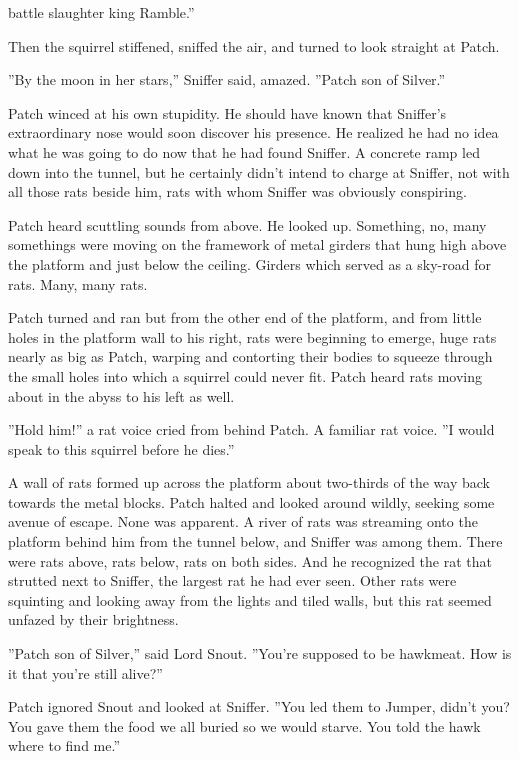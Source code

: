 \documentclass[11pt]{article}
\begin{document}
battle%
slaughter%
king%
Ramble.''\par
 Then the squirrel stiffened, sniffed the air, and turned to look straight at Patch.\par
 ''By the moon in her stars,'' Sniffer said, amazed. ''Patch son of Silver.''\par
 Patch winced at his own stupidity. He should have known that Sniffer's extraordinary nose would soon discover his presence. He realized he had no idea what he was going to do now that he had found Sniffer. A concrete ramp led down into the tunnel, but he certainly didn't intend to charge at Sniffer, not with all those rats beside him, rats with whom Sniffer was obviously conspiring.\par
Patch heard scuttling sounds from above. He looked up. Something, no, many somethings were moving on the framework of metal girders that hung high above the platform and just below the ceiling. Girders which served as a sky-road for rats. Many, many rats.\par
 Patch turned and ran %
 but from the other end of the platform, and from little holes in the platform wall to his right, rats were beginning to emerge, huge rats nearly as big as Patch, warping and contorting their bodies to squeeze through the small holes into which a squirrel could never fit. Patch heard rats moving about in the abyss to his left as well.\par
 ''Hold him!'' a rat voice cried from behind Patch. A familiar rat voice. ''I would speak to this squirrel before he dies.''\par
 A wall of rats formed up across the platform about two-thirds of the way back towards the metal blocks. Patch halted and looked around wildly, seeking some avenue of escape. None was apparent. A river of rats was streaming onto the platform behind him from the tunnel below, and Sniffer was among them. There were rats above, rats below, rats on both sides. And he recognized the rat that strutted next to Sniffer, the largest rat he had ever seen. Other rats were squinting and looking away from the lights and tiled walls, but this rat seemed unfazed by their brightness.\par
 ''Patch son of Silver,'' said Lord Snout. ''You're supposed to be hawkmeat. How is it that you're still alive?''\par
 Patch ignored Snout and looked at Sniffer. ''You led them to Jumper, didn't you? You gave them the food we all buried so we would starve. You told the hawk where to find me.''\par
\end{document}

